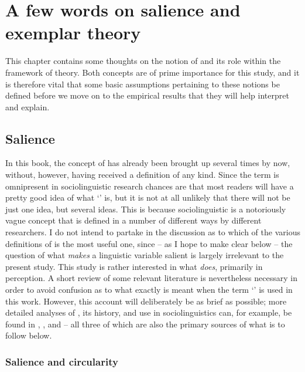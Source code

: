 \chapter{A few words on salience and exemplar theory}
\label{ch.sal}

This chapter contains some thoughts on the notion of  and its role within the framework of  theory.
Both concepts are of prime importance for this study, and it is therefore vital that some basic assumptions pertaining to these notions be defined before we move on to the empirical results that they will help interpret and explain.

	\section{Salience}
	\label{sec.sal.sal}

In this book, the concept of  has already been brought up several times by now, without, however, having received a definition of any kind.
Since the term is omnipresent in sociolinguistic research chances are that most readers will have a pretty good idea of what `' is, but it is not at all unlikely that there will not be just one idea, but several ideas.
This is because sociolinguistic  is a notoriously vague concept that is defined in a number of different ways by different researchers.
I do not intend to partake in the discussion as to which of the various definitions of  is the most useful one, since -- as I hope to make clear below -- the question of what \emph{makes} a linguistic variable salient is largely irrelevant to the present study.
This study is rather interested in what  \emph{does}, primarily in perception.
A short review of some relevant literature is nevertheless necessary in order to avoid confusion as to what exactly is meant when the term `' is used in this work.
However, this account will deliberately be as brief as possible; more detailed analyses of , its history, and use in sociolinguistics can, for example, be found in \cite{kerswillwilliams2002}, \cite{racz2013}, and \cite{auer2014} -- all three of which are also the primary sources of what is to follow below.

		\subsection{Salience and circularity}
		\label{sec.sal.sal.circle}

